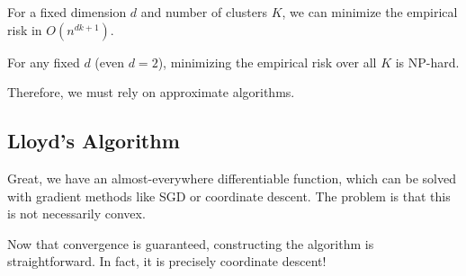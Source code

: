   \begin{theorem}
    \label{thm:exact-k-means-in-fixed-dimension}
    For a fixed dimension $d$ and number of clusters $K$, we can minimize the empirical risk in $O(n^{dk + 1})$. 
  \end{theorem} 

  \begin{theorem}
    \label{thm:k-means-is-np-hard-in-the-plane}
    For any fixed $d$ (even $d = 2$), minimizing the empirical risk over all $K$ is NP-hard. 
  \end{theorem}

  Therefore, we must rely on approximate algorithms. 

\subsection{Lloyd's Algorithm}

  Great, we have an almost-everywhere differentiable function, which can be solved with gradient methods like SGD or coordinate descent. The problem is that this is not necessarily convex. 

  \begin{theorem}
    \label{thm:convergence-of-coordinate-descent}
    
  \end{theorem}
  
  Now that convergence is guaranteed, constructing the algorithm is straightforward. In fact, it is precisely coordinate descent!  


